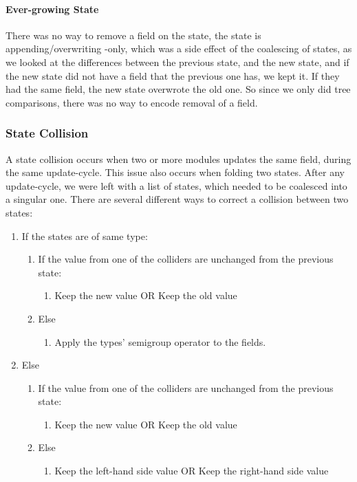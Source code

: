 \paragraph{Ever-growing State} There was no way to remove a field on the state,
the state is appending/overwriting -only, which was a side effect of the
coalescing of states, as we looked at the differences between the previous
state, and the new state, and if the new state did not have a field that the
previous one has, we kept it. If they had the same field, the new state
overwrote the old one. So since we only did tree comparisons, there was no way
to encode removal of a field.

\subsubsection{State Collision} \label{sec:collision}

A state collision occurs when two or more modules updates the same field, during
the same update-cycle. This issue also occurs when folding two states. After any
update-cycle, we were left with a list of states, which needed to be coalesced
into a singular one. There are several different ways to correct a collision
between two states:

\begin{enumerate}
  \item If the states are of same type:
    \begin{enumerate}
      \item If the value from one of the colliders are unchanged from the previous state:
        \begin{enumerate}
          \item Keep the new value OR Keep the old value
        \end{enumerate}
      \item Else
        \begin{enumerate}
          \item Apply the types' semigroup operator to the fields.
        \end{enumerate}
    \end{enumerate}
  \item Else
    \begin{enumerate}
      \item If the value from one of the colliders are unchanged from the previous state:
        \begin{enumerate}
          \item Keep the new value OR Keep the old value
        \end{enumerate}
      \item Else
        \begin{enumerate}
          \item Keep the left-hand side value OR Keep the right-hand side value
        \end{enumerate}
    \end{enumerate}
\end{enumerate}

